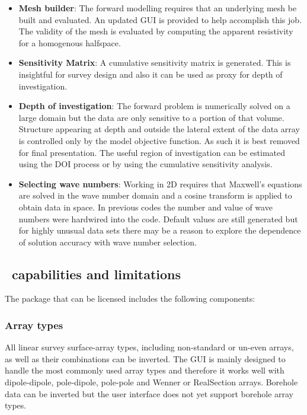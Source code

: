 \begin{itemize}
\item \textbf{Mesh builder}: The forward modelling requires that an underlying mesh be built and evaluated. An updated GUI is provided to help accomplish this job. The validity of the mesh is evaluated by computing the apparent resistivity for a homogenous halfspace.

\item \textbf{Sensitivity Matrix}: A cumulative sensitivity matrix is generated. This is insightful for survey design and also it can be used as proxy for depth of investigation.

\item \textbf{Depth of investigation}: The forward problem is numerically solved on a large domain but the data are only sensitive to a portion of that volume. Structure appearing at depth and outside the lateral extent of the data array is controlled only by the model objective function. As such it is best removed for final presentation. The useful region of investigation can be estimated using the DOI process \cite[]{OldenburgLi99} or by using the cumulative sensitivity analysis.

\item \textbf{Selecting wave numbers}: Working in 2D requires that Maxwell's equations are solved in the wave number domain and a cosine transform is applied to obtain data in space. In previous codes the number and value of wave numbers were hardwired into the code. Default values are still generated but for highly unusual data sets there may be a reason to explore the dependence of solution accuracy with wave number selection.

\end{itemize}

\subsection{\prog~capabilities and limitations}
The package that can be licensed includes the following components: 
\subsubsection{Array types}
All linear survey surface-array types, including non-standard or un-even arrays, as well as their combinations can be inverted. The GUI is mainly designed to handle the most commonly used array types and therefore it works well with dipole-dipole, pole-dipole, pole-pole and Wenner or RealSection arrays. Borehole data can be inverted but the user interface does not yet support borehole array types. 

